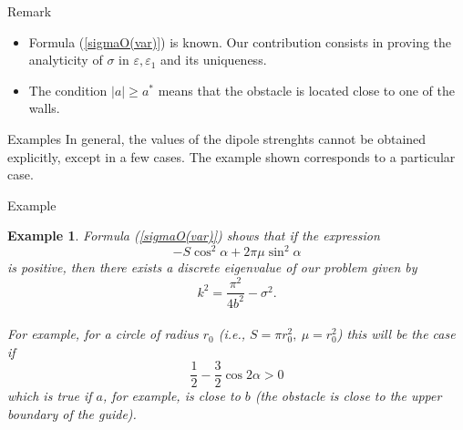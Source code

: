 \documentclass{beamer}
\newtheorem{exa}[teo]{Example}
\newcommand{\ds}{\displaystyle}
\begin{document}
\begin{frame}

\begin{block}{Remark}
\begin{itemize}
\item Formula (\ref{sigmaO(var)}) is known.  
Our contribution consists in proving the analyticity of $\sigma$ in $\varepsilon, \varepsilon_1$ and its uniqueness.
\item The condition $|a|\geq a^{*}$ means that the obstacle is located close to one of the walls.
\end{itemize}
\end{block}

\begin{block}{Examples} In general, the values of the dipole strenghts cannot be obtained explicitly, except in a few cases. The example shown corresponds to a particular case.\end{block}
\end{frame}




\begin{frame}{Example}
\begin{exa}
Formula (\ref{sigmaO(var)}) shows that if the expression 
\begin{equation*}
-S\cos^2\alpha +2\pi\mu\sin^2\alpha
\end{equation*}
is positive, then there exists a discrete eigenvalue of our problem given by \[ k^2=\ds\frac{\pi^2}{4b^2}-\sigma^2.\]\\ For example, for a circle of radius $r_0$ (i.e., $S=\pi r_0^2,~\mu=r_0^2$) this will be the case if
$$
\ds\frac{1}{2}-\ds\frac{3}{2}\cos2\alpha>0
$$
which is true if $a$, for example, is close to $b$ (the obstacle is close to the upper boundary of the guide). 
\end{exa}
\end{frame}
\end{document}
